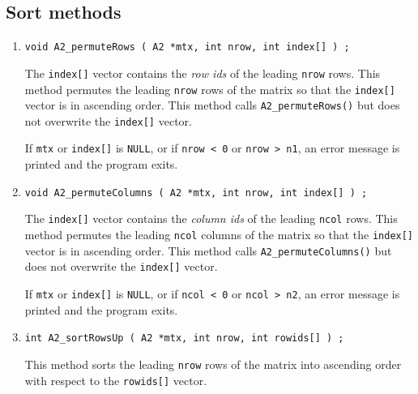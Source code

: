 \subsection{Sort methods}
\label{subsection:A2:proto:sort}
\par
\begin{enumerate}
\item
\begin{verbatim}
void A2_permuteRows ( A2 *mtx, int nrow, int index[] ) ;
\end{verbatim}
The {\tt index[]} vector contains the {\it row ids} of the leading
{\tt nrow} rows.
This method permutes the leading {\tt nrow} rows of the matrix 
so that the {\tt index[]} vector is in ascending order.
This method calls {\tt A2\_permuteRows()} but does not overwrite
the {\tt index[]} vector.
\par
\par {}
If {\tt mtx} or {\tt index[]} is {\tt NULL},
or if {\tt nrow < 0} or {\tt nrow > n1},
an error message is printed and the program exits.
\item
\begin{verbatim}
void A2_permuteColumns ( A2 *mtx, int nrow, int index[] ) ;
\end{verbatim}
The {\tt index[]} vector contains the {\it column ids} of the leading
{\tt ncol} rows.
This method permutes the leading {\tt ncol} columns of the matrix 
so that the {\tt index[]} vector is in ascending order.
This method calls {\tt A2\_permuteColumns()} but does not overwrite
the {\tt index[]} vector.
\par
\par {}
If {\tt mtx} or {\tt index[]} is {\tt NULL},
or if {\tt ncol < 0} or {\tt ncol > n2},
an error message is printed and the program exits.
\item
\begin{verbatim}
int A2_sortRowsUp ( A2 *mtx, int nrow, int rowids[] ) ;
\end{verbatim}
This method sorts the leading {\tt nrow} rows of the matrix 
into ascending order with respect to the {\tt rowids[]} vector.

\end{enumerate}
